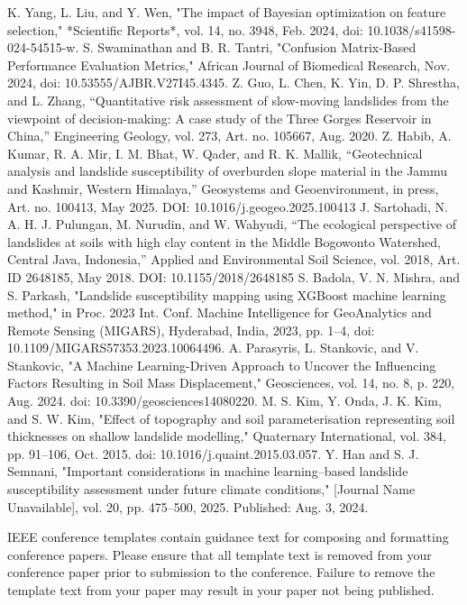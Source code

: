 \documentclass[conference]{IEEEtran}
\begin{document}
\begin{thebibliography}{00}
 K. Yang, L. Liu, and Y. Wen, "The impact of Bayesian optimization on feature selection," *Scientific Reports*, vol. 14, no. 3948, Feb. 2024, doi: 10.1038/s41598-024-54515-w.
 S. Swaminathan and B. R. Tantri, "Confusion Matrix-Based Performance Evaluation Metrics," African Journal of Biomedical Research, Nov. 2024, doi: 10.53555/AJBR.V27I45.4345.
 Z. Guo, L. Chen, K. Yin, D. P. Shrestha, and L. Zhang, “Quantitative risk assessment of slow-moving landslides from the viewpoint of decision-making: A case study of the Three Gorges Reservoir in China,” Engineering Geology, vol. 273, Art. no. 105667, Aug. 2020.
 Z. Habib, A. Kumar, R. A. Mir, I. M. Bhat, W. Qader, and R. K. Mallik, “Geotechnical analysis and landslide susceptibility of overburden slope material in the Jammu and Kashmir, Western Himalaya,” Geosystems and Geoenvironment, in press, Art. no. 100413, May 2025. DOI: 10.1016/j.geogeo.2025.100413
 J. Sartohadi, N. A. H. J. Pulungan, M. Nurudin, and W. Wahyudi, “The ecological perspective of landslides at soils with high clay content in the Middle Bogowonto Watershed, Central Java, Indonesia,” Applied and Environmental Soil Science, vol. 2018, Art. ID 2648185, May 2018. DOI: 10.1155/2018/2648185
 S. Badola, V. N. Mishra, and S. Parkash, "Landslide susceptibility mapping using XGBoost machine learning method," in Proc. 2023 Int. Conf. Machine Intelligence for GeoAnalytics and Remote Sensing (MIGARS), Hyderabad, India, 2023, pp. 1–4, doi: 10.1109/MIGARS57353.2023.10064496.
 A. Parasyris, L. Stankovic, and V. Stankovic, "A Machine Learning-Driven Approach to Uncover the Influencing Factors Resulting in Soil Mass Displacement," Geosciences, vol. 14, no. 8, p. 220, Aug. 2024. doi: 10.3390/geosciences14080220.
 M. S. Kim, Y. Onda, J. K. Kim, and S. W. Kim, "Effect of topography and soil parameterisation representing soil thicknesses on shallow landslide modelling," Quaternary International, vol. 384, pp. 91–106, Oct. 2015. doi: 10.1016/j.quaint.2015.03.057.
 Y. Han and S. J. Semnani, "Important considerations in machine learning–based landslide susceptibility assessment under future climate conditions," [Journal Name Unavailable], vol. 20, pp. 475–500, 2025. Published: Aug. 3, 2024.
\end{thebibliography}

\vspace{12pt}
\color{red}
IEEE conference templates contain guidance text for composing and formatting conference papers. Please ensure that all template text is removed from your conference paper prior to submission to the conference. Failure to remove the template text from your paper may result in your paper not being published.
\end{document}
